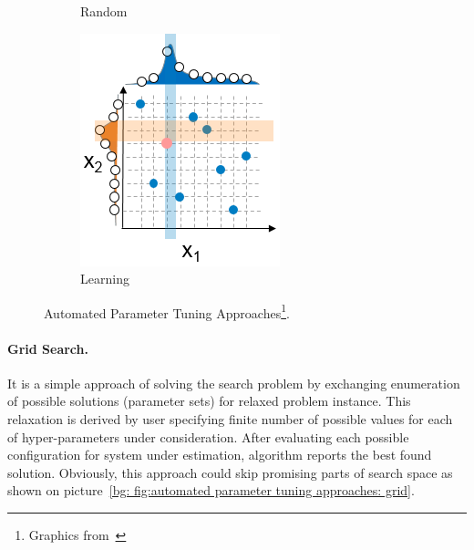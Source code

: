 \begin{figure}
\begin{subfigure}[b]{0.25\linewidth}
		\caption{Random}
		\label{bg: fig:automated parameter tuning approaches: random}
	\end{subfigure}
	\begin{subfigure}[b]{0.25\linewidth}
		\includegraphics[width=\linewidth]{graphics/Background/hyperparameter-learning-search.png}
		\caption{Learning}
		\label{bg: fig:automated parameter tuning approaches: learning}
	\end{subfigure}
	\caption{Automated Parameter Tuning Approaches\protect\footnote{Graphics from~\cite{koch2017automated}}.}
	\label{bg: fig:automated parameter tuning approaches}
\end{figure}


\paragraph{Grid Search.} It is a simple approach of solving the search problem by exchanging enumeration of possible solutions (parameter sets) for relaxed problem instance. This relaxation is derived by user specifying finite number of possible values for each of hyper-parameters under consideration. After evaluating each possible configuration for system under estimation, algorithm reports the best found solution. Obviously, this approach could skip promising parts of search space as shown on picture~\ref{bg: fig:automated parameter tuning approaches: grid}.


